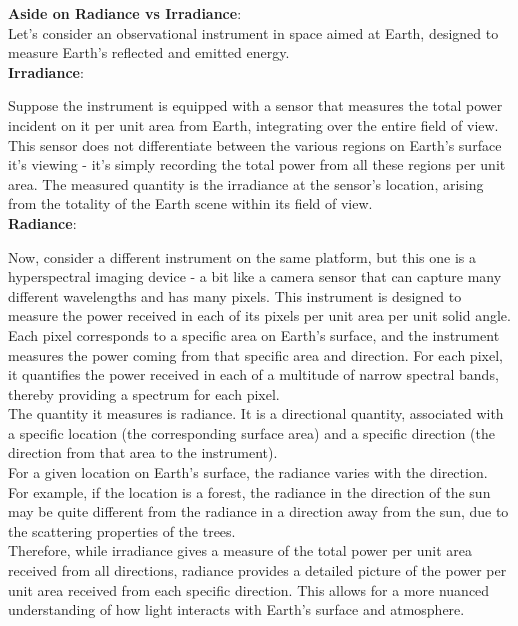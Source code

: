 \begin{tcolorbox}
    \textbf{Aside on Radiance vs Irradiance}:\\

    Let's consider an observational instrument in space aimed at Earth, designed
    to measure Earth's reflected and emitted energy.\\

    \noindent \textbf{Irradiance}:

    Suppose the instrument is equipped with a sensor that measures the total 
    power incident on it per unit area from Earth, integrating over the entire
    field of view. This sensor does not differentiate between the various regions
    on Earth's surface it's viewing - it's simply recording the total power from
    all these regions per unit area. The measured quantity is the irradiance at 
    the sensor's location, arising from the totality of the Earth scene within 
    its field of view.\\

    \noindent \textbf{Radiance}:

    Now, consider a different instrument on the same platform, but this one is a
    hyperspectral imaging device - a bit like a camera sensor that can capture
    many different wavelengths and has many pixels. 
    This instrument is designed to measure the
    power received in each of its pixels per unit area per unit solid angle. 
    Each pixel corresponds to a specific area on Earth's surface, and the 
    instrument measures the power coming from that specific area and direction. 
    For each pixel, it quantifies the power received in each of a multitude of 
    narrow spectral bands, thereby providing a spectrum for each pixel.\\

    The quantity it measures is radiance. It is a directional quantity, 
    associated with a specific location (the corresponding surface area) and a 
    specific direction (the direction from that area to the instrument). \\

    For a given location on Earth's surface, the radiance varies with the direction.
    For example, if the location is a forest, the radiance in the direction of the 
    sun may be quite different from the radiance in a direction away from the sun, 
    due to the scattering properties of the trees. \\

    Therefore, while irradiance gives a measure of the total power per unit area
    received from all directions, radiance provides a detailed picture of the 
    power per unit area received from each specific direction. This allows for
    a more nuanced understanding of how light interacts with Earth's surface 
    and atmosphere.
\end{tcolorbox}


